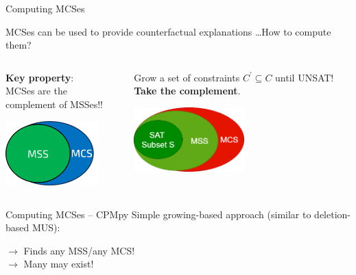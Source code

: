\documentclass{cons-beamer}
\begin{document}
\begin{frame}{Computing MCSes}

  MCSes can be used to provide counterfactual explanations \dots How to compute them?
  \vfill

  \begin{columns}
    \begin{column}{0.5\textwidth}
      \textbf{Key property}: \\MCSes are the complement of MSSes!!
      \begin{center}
        \includegraphics[height=25mm]{images/texpl_img/mcs.png}
      \end{center}
    \end{column}

    \begin{column}{0.5\textwidth}
      Grow a set of constraints $C^{\prime} \subseteq C$ until UNSAT! \textbf{Take the complement}.
      \begin{center}
        \includegraphics[height=25mm]{images/texpl_img/mcs_grow.png}
      \end{center}
    \end{column}
  \end{columns}
\end{frame}

\begin{flashcardcpmpy}
\begin{frame}{Computing MCSes -- CPMpy}
  Simple growing-based approach (similar to deletion-based MUS):

  \begin{example}
    \footnotesize   
  \end{example}

  $\xrightarrow{}$ Finds any MSS/any MCS!\\
  $\xrightarrow{}$ Many may exist!
\end{frame}
\end{flashcardcpmpy}
\end{document}
